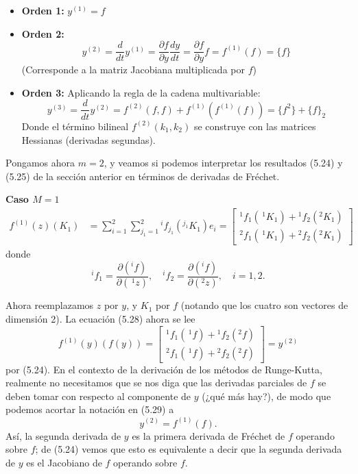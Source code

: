 \begin{itemize}
    \item \textbf{Orden 1:} $y^{(1)} = f$
    \item \textbf{Orden 2:} 
    $$y^{(2)} = \frac{d}{dt} y^{(1)} = \frac{\partial f}{\partial y} \frac{dy}{dt} = \frac{\partial f}{\partial y} f = f^{(1)}(f) = \{f\}$$
    (Corresponde a la matriz Jacobiana multiplicada por $f$)
    \item \textbf{Orden 3:} 
    Aplicando la regla de la cadena multivariable:
    $$y^{(3)} = \frac{d}{dt} y^{(2)} = f^{(2)}(f, f) + f^{(1)}(f^{(1)}(f)) = \{f^2\} + \{f\}_2$$
    Donde el término bilineal $f^{(2)}(k_1, k_2)$ se construye con las matrices Hessianas (derivadas segundas).
\end{itemize}


Pongamos ahora $m = 2$, y veamos si podemos interpretar los resultados (5.24) y (5.25) de la sección anterior en términos de derivadas de Fréchet.

\textbf{Caso $M = 1$}
\begin{align}
f^{(1)}(z)(K_1) &= \sum_{i=1}^2 \sum_{j_1=1}^2 {}^i f_{j_1} ({}^{j_1} K_1) e_i = \begin{bmatrix} \!^1 f_1 (\, \!^1 K_1) + \!^1 f_2 (^2 K_1) \\\!^2 f_1 (\, \!^1 K_1) +\!^2 f_2 (^2 K_1) \end{bmatrix} \tag{5.28}
\end{align}
donde
\[
^i f_1 = \frac{\partial (^i f)}{\partial (\, \!^1 z)}, \quad ^i f_2 = \frac{\partial (^i f)}{\partial (^2 z)}, \quad i = 1, 2.
\]

Ahora reemplazamos $z$ por $y$, y $K_1$ por $f$ (notando que los cuatro son vectores de dimensión 2). La ecuación (5.28) ahora se lee
\begin{equation*}
f^{(1)}(y)(f(y)) = \begin{bmatrix} \!^1 f_1 (\, \!^1 f) + \!^1 f_2 (^2 f) \\\!^2 f_1 (\, \!^1 f) +\!^2 f_2 (^2 f) \end{bmatrix} = y^{(2)} \tag{5.29}
\end{equation*}
por (5.24). En el contexto de la derivación de los métodos de Runge-Kutta, realmente no necesitamos que se nos diga que las derivadas parciales de $f$ se deben tomar con respecto al componente de $y$ (¿qué más hay?), de modo que podemos acortar la notación en (5.29) a
\begin{equation*}
y^{(2)} = f^{(1)}(f). \tag{5.30}
\end{equation*}
Así, la segunda derivada de $y$ es la primera derivada de Fréchet de $f$ operando sobre $f$; de (5.24) vemos que esto es equivalente a decir que la segunda derivada de $y$ es el Jacobiano de $f$ operando sobre $f$.

